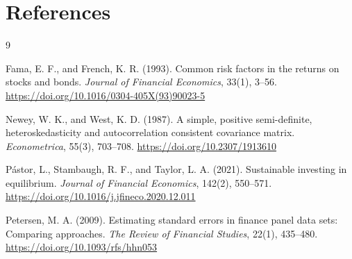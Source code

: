 \documentclass[11pt]{article}
\begin{document}
\section*{References}

\begin{thebibliography}{9}

Fama, E. F., and French, K. R. (1993).
\newblock Common risk factors in the returns on stocks and bonds.
\newblock \emph{Journal of Financial Economics}, 33(1), 3--56.
\newblock \url{https://doi.org/10.1016/0304-405X(93)90023-5}

Newey, W. K., and West, K. D. (1987).
\newblock A simple, positive semi-definite, heteroskedasticity and
autocorrelation consistent covariance matrix.
\newblock \emph{Econometrica}, 55(3), 703--708.
\newblock \url{https://doi.org/10.2307/1913610}

P\'astor, L., Stambaugh, R. F., and Taylor, L. A. (2021).
\newblock Sustainable investing in equilibrium.
\newblock \emph{Journal of Financial Economics}, 142(2), 550--571.
\newblock \url{https://doi.org/10.1016/j.jfineco.2020.12.011}

Petersen, M. A. (2009).
\newblock Estimating standard errors in finance panel data sets: Comparing
approaches.
\newblock \emph{The Review of Financial Studies}, 22(1), 435--480.
\newblock \url{https://doi.org/10.1093/rfs/hhn053}

\end{thebibliography}
\end{document}
